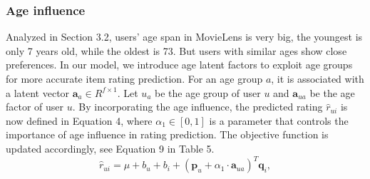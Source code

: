 \documentclass{llncs}
\begin{document}
	\subsubsection{Age influence}
	Analyzed in Section 3.2, users' age span in MovieLens is very big, the youngest is only 7 years old,
	while the oldest is 73. But users with similar ages show close preferences. In our model,
	we introduce age latent factors to exploit age groups for more accurate item rating prediction.
	For an age group $a$, it is associated with a latent vector $\mathbf{a}_a\in R^{f\times1}$.
	Let $u_a$ be the age group of user $u$ and $\mathbf{a}_{ua}$ be the age factor of user $u$.
	By incorporating the age influence, the predicted rating $\hat{r}_{ui}$ is now defined in Equation 4, where
	$\alpha_1\in[0,1]$ is a parameter that controls the importance of age influence in rating prediction.
	The objective function is updated accordingly, see Equation 9 in Table 5.
	\begin{equation}\label{3}
		\hat{r}_{ui}=\mu+b_u+b_i+(\mathbf{p}_u+\alpha_1\cdot \mathbf{a}_{ua})^T\mathbf{q}_i,
	\end{equation}
\end{document}
